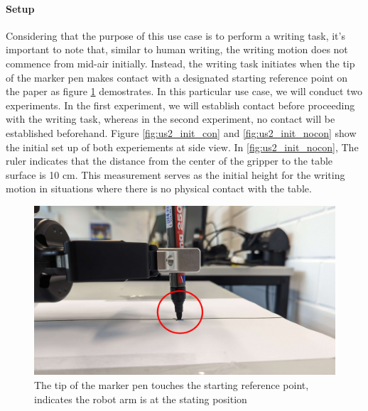 \documentclass[report.tex]{subfiles}
\begin{document}
    \paragraph{\large{Setup}\\}
    Considering that the purpose of this use case is to perform a writing task, it's important to note that, similar to human writing, the writing motion does not commence from mid-air initially. Instead, the writing task initiates when the tip of the marker pen makes contact with a designated starting reference point on the paper as figure \ref{fig:us2_pen} demostrates. In this particular use case, we will conduct two experiments. In the first experiment, we will establish contact before proceeding with the writing task, whereas in the second experiment, no contact will be established beforehand. Figure \ref{fig:us2_init_con} and \ref{fig:us2_init_nocon} show the initial set up of both experiements at side view. In \ref{fig:us2_init_nocon}, The ruler indicates that the distance from the center of the gripper to the table surface is 10 cm. This measurement serves as the initial height for the writing motion in situations where there is no physical contact with the table.
    \begin{figure}[H]
        \centering
        \captionsetup[figure]{justification=centering}
        \includegraphics[width=0.9\linewidth]{images/us2_starting_circle.jpg}
        \caption{The tip of the marker pen touches the starting reference point, indicates the robot arm is at the stating position}
        \label{fig:us2_pen}
    \end{figure}
\end{document}
